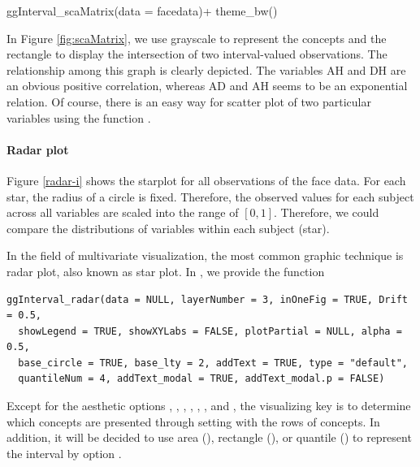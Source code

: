 \documentclass[article]{jss}
\begin{document}
\begin{CodeChunk}
\begin{CodeInput}
ggInterval_scaMatrix(data = facedata)+
  theme_bw()
\end{CodeInput}
\end{CodeChunk}



In Figure \ref{fig:scaMatrix}, we use grayscale to represent the concepts and the rectangle to display the intersection of two interval-valued observations. The relationship among this graph is clearly depicted. The variables AH and DH are an obvious positive correlation, whereas AD and AH seems to be an exponential relation. Of course, there is an easy way for scatter plot of two particular variables using the function . 




\paragraph{Radar plot}
Figure \ref{radar-i} shows
the starplot for all observations of the face data. For
each star, the radius of a circle is fixed. Therefore, the observed
values for each subject across all variables are scaled into the range of
$[0, 1]$. Therefore, we could compare the distributions of variables
within each subject (star).

In the field of multivariate visualization, the most common graphic technique is radar plot, also known as star plot. In , we provide the function

\begin{verbatim}
ggInterval_radar(data = NULL, layerNumber = 3, inOneFig = TRUE, Drift = 0.5, 
  showLegend = TRUE, showXYLabs = FALSE, plotPartial = NULL, alpha = 0.5, 
  base_circle = TRUE, base_lty = 2, addText = TRUE, type = "default",
  quantileNum = 4, addText_modal = TRUE, addText_modal.p = FALSE)
\end{verbatim}

Except for the aesthetic options , , , , , , and , the visualizing key is to determine which concepts are presented through setting  with the rows of concepts. In addition, it will be decided to use area (), rectangle (), or quantile () to represent the interval by option .
\end{document}
